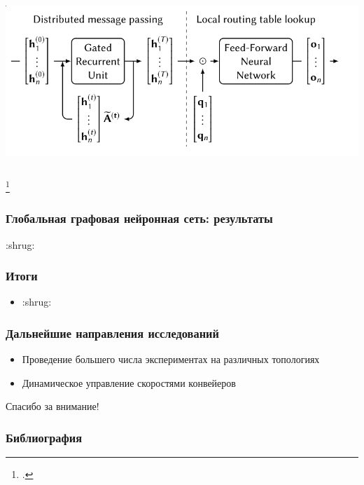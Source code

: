 \documentclass{beamer}
\begin{document}
\begin{frame}
\begin{columns}
\begin{column}{0.4\textwidth}
\begin{center}
        \includegraphics[width=\textwidth]{gg-qnn.png}
      \end{center}
    \end{column}
  \end{columns}
  \footcitetext{geyer2018learning}
\end{frame}

\begin{frame}
  \frametitle{Глобальная графовая нейронная сеть: результаты}
  \huge{:shrug:}
\end{frame}


\begin{frame}
  \frametitle{Итоги}
  \begin{itemize}
  \item :shrug:
  \end{itemize}
\end{frame}


\begin{frame}
  \frametitle{Дальнейшие направления исследований}
  \begin{itemize}
  \item Проведение большего числа экспериментах на различных топологиях
  \item Динамическое управление скоростями конвейеров
  \end{itemize}
\end{frame}


\begin{frame}
  \begin{center}
    {\Huge Спасибо за внимание!}
  \end{center}
\end{frame}

\begin{frame}[allowframebreaks]
  \frametitle{Библиография}
  \printbibliography
\end{frame}
\end{document}
